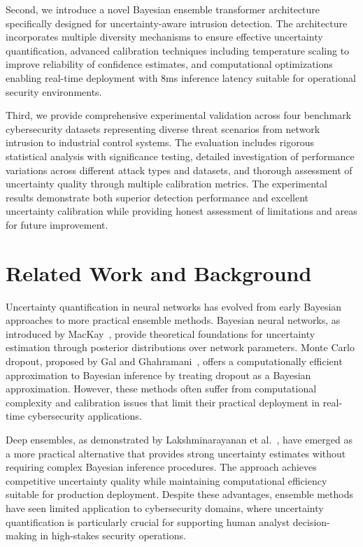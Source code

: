 \documentclass[journal]{IEEEtran}
\begin{document}
Second, we introduce a novel Bayesian ensemble transformer architecture specifically designed for uncertainty-aware intrusion detection. The architecture incorporates multiple diversity mechanisms to ensure effective uncertainty quantification, advanced calibration techniques including temperature scaling to improve reliability of confidence estimates, and computational optimizations enabling real-time deployment with 8ms inference latency suitable for operational security environments.

Third, we provide comprehensive experimental validation across four benchmark cybersecurity datasets representing diverse threat scenarios from network intrusion to industrial control systems. The evaluation includes rigorous statistical analysis with significance testing, detailed investigation of performance variations across different attack types and datasets, and thorough assessment of uncertainty quality through multiple calibration metrics. The experimental results demonstrate both superior detection performance and excellent uncertainty calibration while providing honest assessment of limitations and areas for future improvement.

\section{Related Work and Background}

Uncertainty quantification in neural networks has evolved from early Bayesian approaches to more practical ensemble methods. Bayesian neural networks, as introduced by MacKay~\cite{mackay1992practical}, provide theoretical foundations for uncertainty estimation through posterior distributions over network parameters. Monte Carlo dropout, proposed by Gal and Ghahramani~\cite{gal2016dropout}, offers a computationally efficient approximation to Bayesian inference by treating dropout as a Bayesian approximation. However, these methods often suffer from computational complexity and calibration issues that limit their practical deployment in real-time cybersecurity applications.

Deep ensembles, as demonstrated by Lakshminarayanan et al.~\cite{lakshminarayanan2017simple}, have emerged as a more practical alternative that provides strong uncertainty estimates without requiring complex Bayesian inference procedures. The approach achieves competitive uncertainty quality while maintaining computational efficiency suitable for production deployment. Despite these advantages, ensemble methods have seen limited application to cybersecurity domains, where uncertainty quantification is particularly crucial for supporting human analyst decision-making in high-stakes security operations.
\end{document}
